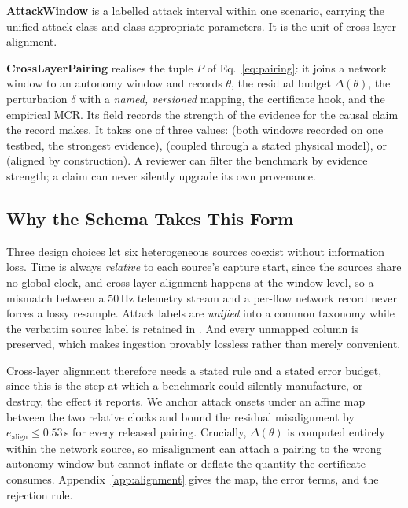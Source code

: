 \textbf{AttackWindow} is a labelled attack interval within one scenario,
carrying the unified attack class and class-appropriate 
parameters. It is the unit of cross-layer alignment.

\textbf{CrossLayerPairing} realises the tuple $P$ of Eq.~\eqref{eq:pairing}: it
joins a network window to an autonomy window and records $\theta$, the residual
budget $\Delta(\theta)$, the perturbation $\delta$ with a \emph{named,
versioned} mapping, the certificate hook, and the empirical MCR. Its
 field records the strength of the evidence for the
causal claim the record makes. It takes one of three values:
 (both windows recorded on one testbed, the
strongest evidence),  (coupled through a stated physical
model), or  (aligned by construction). A reviewer can
filter the benchmark by evidence strength; a claim can never silently upgrade
its own provenance.

\subsection{Why the Schema Takes This Form}
Three design choices let six heterogeneous sources coexist without information
loss. Time is always \emph{relative} to each source's capture start, since the
sources share no global clock, and cross-layer alignment happens at the window
level, so a mismatch between a $50$\,Hz telemetry stream and a per-flow network
record never forces a lossy resample. Attack labels are \emph{unified} into a
common taxonomy while the verbatim source label is retained in
. And every unmapped column is preserved, which makes
ingestion provably lossless rather than merely convenient.

Cross-layer alignment therefore needs a stated rule and a stated error budget,
since this is the step at which a benchmark could silently manufacture, or
destroy, the effect it reports. We anchor attack onsets under an affine map
between the two relative clocks and bound the residual misalignment by
$e_{\mathrm{align}}\le0.53$\,s for every released pairing. Crucially,
$\Delta(\theta)$ is computed entirely within the network source, so misalignment
can attach a pairing to the wrong autonomy window but cannot inflate or deflate
the quantity the certificate consumes. Appendix~\ref{app:alignment} gives the
map, the error terms, and the rejection rule.

